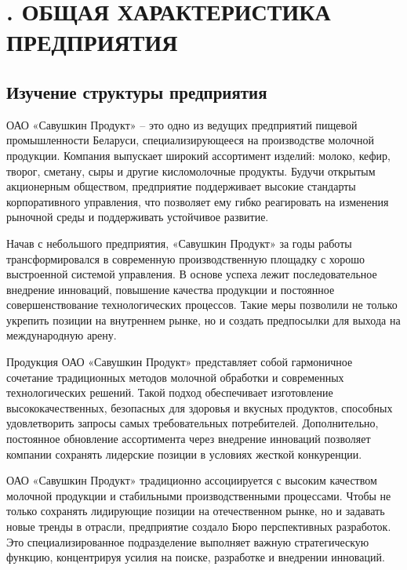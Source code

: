 \sectionbreak \section*{
	\gostTitleFont
	. ОБЩАЯ ХАРАКТЕРИСТИКА ПРЕДПРИЯТИЯ
}

\titlespace

\subsection*{ 
	\gostTitleFont
	 Изучение структуры предприятия
} 

\subtitlespace

{\gostFont
	
	\par \redline ОАО «Савушкин Продукт» – это одно из ведущих предприятий пищевой промышленности Беларуси, специализирующееся на производстве молочной продукции. Компания выпускает широкий ассортимент изделий: молоко, кефир, творог, сметану, сыры и другие кисломолочные продукты. Будучи открытым акционерным обществом, предприятие поддерживает высокие стандарты корпоративного управления, что позволяет ему гибко реагировать на изменения рыночной среды и поддерживать устойчивое развитие. 
	
	\par \redline Начав с небольшого предприятия, «Савушкин Продукт» за годы работы трансформировался в современную производственную площадку с хорошо выстроенной системой управления. В основе успеха лежит последовательное внедрение инноваций, повышение качества продукции и постоянное совершенствование технологических процессов. Такие меры позволили не только укрепить позиции на внутреннем рынке, но и создать предпосылки для выхода на международную арену.
	
	\par \redline Продукция ОАО «Савушкин Продукт» представляет собой гармоничное сочетание традиционных методов молочной обработки и современных технологических решений. Такой подход обеспечивает изготовление высококачественных, безопасных для здоровья и вкусных продуктов, способных удовлетворить запросы самых требовательных потребителей. Дополнительно, постоянное обновление ассортимента через внедрение инноваций позволяет компании сохранять лидерские позиции в условиях жесткой конкуренции. 
	
	\par \redline ОАО «Савушкин Продукт» традиционно ассоциируется с высоким качеством молочной продукции и стабильными производственными процессами. Чтобы не только сохранять лидирующие позиции на отечественном рынке, но и задавать новые тренды в отрасли, предприятие создало Бюро перспективных разработок. Это специализированное подразделение выполняет важную стратегическую функцию, концентрируя усилия на поиске, разработке и внедрении инноваций. 
	
}
